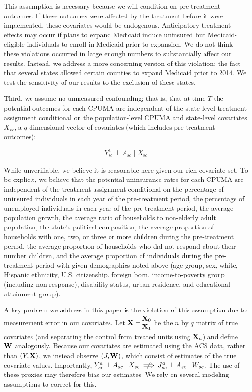 This assumption is necessary because we will condition on pre-treatment outcomes. If these outcomes were affected by the treatment before it were implemented, these covariates would be endogenous. Anticipatory treatment effects may occur if plans to expand Medicaid induce uninsured but Medicaid-eligible individuals to enroll in Medicaid prior to expansion. We do not think these violations occurred in large enough numbers to substantially affect our results. Instead, we address a more concerning version of this violation: the fact that several states allowed certain counties to expand Medicaid prior to 2014. We test the sensitivity of our results to the exclusion of these states.

Third, we assume no unmeasured confounding; that is, that at time $T$ the potential outcomes for each CPUMA are independent of the state-level treatment assignment conditional on the population-level CPUMA and state-level covariates $X_{sc}$, a $q$ dimensional vector of covariates (which includes pre-treatment outcomes):

\begin{align*}
Y_{sc}^a \perp A_{sc} \mid X_{sc}
\end{align*}

While unverifiable, we believe it is reasonable here given our rich covariate set. To be explicit, we believe that the potential uninsurance rates for each CPUMA are independent of the treatment assignment conditional on the percentage of uninsured individuals in each year of the pre-treatment period, the percentage of unemployed individuals in each year of the pre-treatment period, the average population growth, the average ratio of households to non-elderly adult population, the state's political composition, the average proportion of households with one, two, or three or more children during the pre-treatment period, the average proportion of households who did not respond about their number children, and the average proportion of individuals during the pre-treatment period with given demographics noted above (age group, sex, white, Hispanic ethnicity, U.S. citizenship, foreign born, income-to-poverty group (including non-response), disability status, urban residence, and educational attainment group). 

A key problem we address in this paper is the violation of this assumption due to measurement error in our covariates. Let 
$\matr{X} = \begin{matrix}
\matr{X}_0\\
\matr{X}_1
\end{matrix}$ be the $n$ by $q$ matrix of true covariates (and separating the control from treated units using $\mathbf{X}_a$) and define $\mathbf{W}$ analogously. Because our covariates are estimated using the ACS data, rather than $(Y, \mathbf{X})$, we instead observe $(J, \mathbf{W})$, which consist of estimates of the true covariate values. Importantly, $Y_{sc}^a \perp A_{sc} \mid X_{sc} \centernot\implies J_{sc}^a \perp A_{sc} \mid W_{sc}$. The use of these proxies may therefore bias our estimates. We rely on several modeling assumptions to correct for this.

